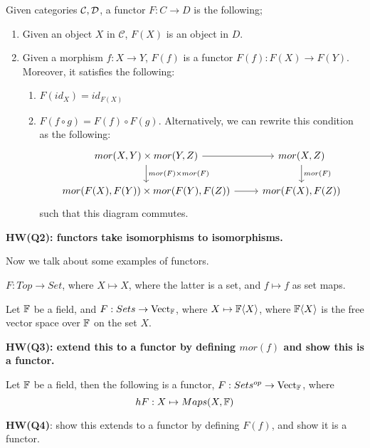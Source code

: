 \begin{defn}[functor]
    Given categories $\mathcal{C},\mathcal{D}$, a functor $F:C\to D$ is the following;
    \begin{enumerate}
        \item Given an object $X$ in $\mathcal{C}$, $F(X)$ is an object in $D$. 
        \item Given a morphism $f: X\to Y$, $F(f)$ is a functor $F(f): F(X)\to F(Y)$. Moreover, it satisfies the following:
        \begin{enumerate}
            \item $F(id_X)=id_{F(X)}$
            \item $F(f\circ g)=F(f)\circ F(g)$. Alternatively, we can rewrite this condition as the following: 
            \[\begin{tikzcd}
                {mor(X,Y)\times mor(Y,Z)} & {mor(X,Z)} \\
                {mor(F(X), F(Y))\times mor(F(Y),F(Z))} & {mor(F(X),F(Z))}
                \arrow[from=1-1, to=1-2]
                \arrow["{mor(F)\times mor(F)}", from=1-1, to=2-1]
                \arrow["{mor(F)}", from=1-2, to=2-2]
                \arrow[from=2-1, to=2-2]
            \end{tikzcd}\]
            such that this diagram commutes.
        \end{enumerate}
    \end{enumerate}
\end{defn}
\begin{prob}
    \textbf{HW(Q2): functors take isomorphisms to isomorphisms.}
\end{prob}
Now we talk about some examples of functors.
\begin{example}
    $F: Top\to Set$, where $X\mapsto X$, where the latter is a set, and $f\mapsto f$ as set maps.
\end{example}
\begin{example}
    Let $\mathbb{F}$ be a field, and $F: Sets\to \text{Vect}_{\mathbb{F}}$, where $X\mapsto \mathbb{F}\langle X\rangle$, where $\mathbb{F}\langle X\rangle$ is the free vector space over $\mathbb{F}$ on the set $X$.
\end{example}
\begin{prob}
    \textbf{HW(Q3): extend this to a functor by defining $mor(f)$ and show this is a functor.}
\end{prob}
\begin{example}
    Let $\mathbb{F}$ be a field, then the following is a functor, $F: Sets^{op}\to\text{Vect}_{\mathbb{F}}$, where
    \begin{equation*}
        h  F: X\mapsto Maps(X,\mathbb{F})
    \end{equation*}
\end{example}
\begin{prob}
    \textbf{HW(Q4)}: show this extends to a functor by defining $F(f)$, and show it is a functor.
\end{prob}


